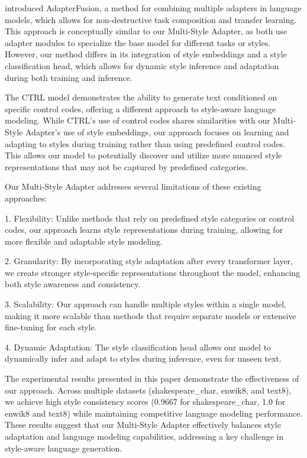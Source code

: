 \documentclass{article} %
\begin{document}
\citet{Pfeiffer2020AdapterFusionNT} introduced AdapterFusion, a method for combining multiple adapters in language models, which allows for non-destructive task composition and transfer learning. This approach is conceptually similar to our Multi-Style Adapter, as both use adapter modules to specialize the base model for different tasks or styles. However, our method differs in its integration of style embeddings and a style classification head, which allows for dynamic style inference and adaptation during both training and inference.

The CTRL model \cite{Keskar2019CTRLAC} demonstrates the ability to generate text conditioned on specific control codes, offering a different approach to style-aware language modeling. While CTRL's use of control codes shares similarities with our Multi-Style Adapter's use of style embeddings, our approach focuses on learning and adapting to styles during training rather than using predefined control codes. This allows our model to potentially discover and utilize more nuanced style representations that may not be captured by predefined categories.

Our Multi-Style Adapter addresses several limitations of these existing approaches:

1. Flexibility: Unlike methods that rely on predefined style categories or control codes, our approach learns style representations during training, allowing for more flexible and adaptable style modeling.

2. Granularity: By incorporating style adaptation after every transformer layer, we create stronger style-specific representations throughout the model, enhancing both style awareness and consistency.

3. Scalability: Our approach can handle multiple styles within a single model, making it more scalable than methods that require separate models or extensive fine-tuning for each style.

4. Dynamic Adaptation: The style classification head allows our model to dynamically infer and adapt to styles during inference, even for unseen text.

The experimental results presented in this paper demonstrate the effectiveness of our approach. Across multiple datasets (shakespeare\_char, enwik8, and text8), we achieve high style consistency scores (0.9667 for shakespeare\_char, 1.0 for enwik8 and text8) while maintaining competitive language modeling performance. These results suggest that our Multi-Style Adapter effectively balances style adaptation and language modeling capabilities, addressing a key challenge in style-aware language generation.
\end{document}
